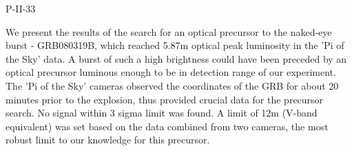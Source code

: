 P-II-33


\bigskip



\bigskip

\noindent We present the results of the search for an optical precursor to the naked-eye burst - GRB080319B, which reached 5.87m optical peak luminosity in the 'Pi of the Sky' data. A burst of such a high brightness could have been preceded by an optical precursor luminous enough to be in detection range of our experiment. The 'Pi of the Sky' cameras observed the coordinates of the GRB for about 20 minutes prior to the explosion, thus provided crucial data for the precursor search. No signal within 3 sigma limit was found. A limit of 12m (V-band equivalent) was set based on the data combined from two cameras, the most robust limit to our knowledge for this precursor.
